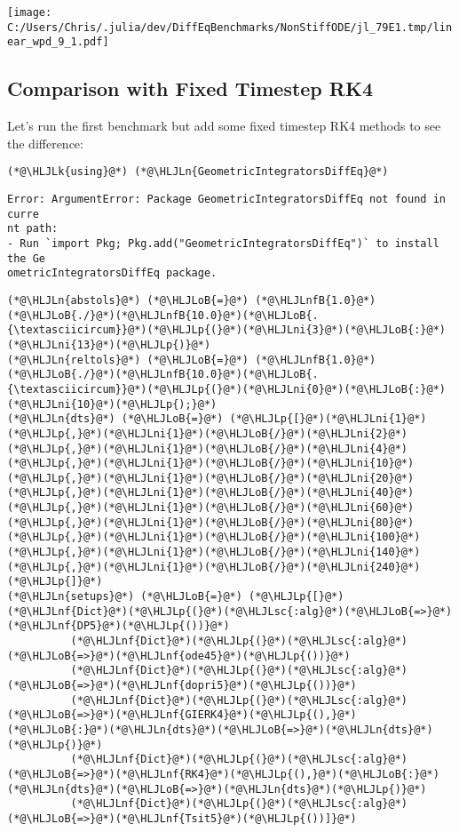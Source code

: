 \documentclass[12pt,a4paper]{article}
\newcommand{\HLJLk}[1]{\textcolor[RGB]{148,91,176}{\textbf{#1}}}
\newcommand{\HLJLn}[1]{#1}
\newcommand{\HLJLnf}[1]{\textcolor[RGB]{66,102,213}{#1}}
\newcommand{\HLJLsc}[1]{\textcolor[RGB]{201,61,57}{#1}}
\newcommand{\HLJLnfB}[1]{\textcolor[RGB]{59,151,46}{#1}}
\newcommand{\HLJLni}[1]{\textcolor[RGB]{59,151,46}{#1}}
\newcommand{\HLJLoB}[1]{\textcolor[RGB]{102,102,102}{\textbf{#1}}}
\newcommand{\HLJLp}[1]{#1}
\begin{document}
\texttt{[image: C:/Users/Chris/.julia/dev/DiffEqBenchmarks/NonStiffODE/jl\_79E1.tmp/linear\_wpd\_9\_1.pdf]}

\subsection{Comparison with Fixed Timestep RK4}
Let's run the first benchmark but add some fixed timestep RK4 methods to see the difference:


\begin{lstlisting}
(*@\HLJLk{using}@*) (*@\HLJLn{GeometricIntegratorsDiffEq}@*)
\end{lstlisting}

\begin{lstlisting}
Error: ArgumentError: Package GeometricIntegratorsDiffEq not found in curre
nt path:
- Run `import Pkg; Pkg.add("GeometricIntegratorsDiffEq")` to install the Ge
ometricIntegratorsDiffEq package.
\end{lstlisting}


\begin{lstlisting}
(*@\HLJLn{abstols}@*) (*@\HLJLoB{=}@*) (*@\HLJLnfB{1.0}@*)(*@\HLJLoB{./}@*)(*@\HLJLnfB{10.0}@*)(*@\HLJLoB{.{\textasciicircum}}@*)(*@\HLJLp{(}@*)(*@\HLJLni{3}@*)(*@\HLJLoB{:}@*)(*@\HLJLni{13}@*)(*@\HLJLp{)}@*)
(*@\HLJLn{reltols}@*) (*@\HLJLoB{=}@*) (*@\HLJLnfB{1.0}@*)(*@\HLJLoB{./}@*)(*@\HLJLnfB{10.0}@*)(*@\HLJLoB{.{\textasciicircum}}@*)(*@\HLJLp{(}@*)(*@\HLJLni{0}@*)(*@\HLJLoB{:}@*)(*@\HLJLni{10}@*)(*@\HLJLp{);}@*)
(*@\HLJLn{dts}@*) (*@\HLJLoB{=}@*) (*@\HLJLp{[}@*)(*@\HLJLni{1}@*)(*@\HLJLp{,}@*)(*@\HLJLni{1}@*)(*@\HLJLoB{/}@*)(*@\HLJLni{2}@*)(*@\HLJLp{,}@*)(*@\HLJLni{1}@*)(*@\HLJLoB{/}@*)(*@\HLJLni{4}@*)(*@\HLJLp{,}@*)(*@\HLJLni{1}@*)(*@\HLJLoB{/}@*)(*@\HLJLni{10}@*)(*@\HLJLp{,}@*)(*@\HLJLni{1}@*)(*@\HLJLoB{/}@*)(*@\HLJLni{20}@*)(*@\HLJLp{,}@*)(*@\HLJLni{1}@*)(*@\HLJLoB{/}@*)(*@\HLJLni{40}@*)(*@\HLJLp{,}@*)(*@\HLJLni{1}@*)(*@\HLJLoB{/}@*)(*@\HLJLni{60}@*)(*@\HLJLp{,}@*)(*@\HLJLni{1}@*)(*@\HLJLoB{/}@*)(*@\HLJLni{80}@*)(*@\HLJLp{,}@*)(*@\HLJLni{1}@*)(*@\HLJLoB{/}@*)(*@\HLJLni{100}@*)(*@\HLJLp{,}@*)(*@\HLJLni{1}@*)(*@\HLJLoB{/}@*)(*@\HLJLni{140}@*)(*@\HLJLp{,}@*)(*@\HLJLni{1}@*)(*@\HLJLoB{/}@*)(*@\HLJLni{240}@*)(*@\HLJLp{]}@*)
(*@\HLJLn{setups}@*) (*@\HLJLoB{=}@*) (*@\HLJLp{[}@*)(*@\HLJLnf{Dict}@*)(*@\HLJLp{(}@*)(*@\HLJLsc{:alg}@*)(*@\HLJLoB{=>}@*)(*@\HLJLnf{DP5}@*)(*@\HLJLp{())}@*)
          (*@\HLJLnf{Dict}@*)(*@\HLJLp{(}@*)(*@\HLJLsc{:alg}@*)(*@\HLJLoB{=>}@*)(*@\HLJLnf{ode45}@*)(*@\HLJLp{())}@*)
          (*@\HLJLnf{Dict}@*)(*@\HLJLp{(}@*)(*@\HLJLsc{:alg}@*)(*@\HLJLoB{=>}@*)(*@\HLJLnf{dopri5}@*)(*@\HLJLp{())}@*)
          (*@\HLJLnf{Dict}@*)(*@\HLJLp{(}@*)(*@\HLJLsc{:alg}@*)(*@\HLJLoB{=>}@*)(*@\HLJLnf{GIERK4}@*)(*@\HLJLp{(),}@*)(*@\HLJLoB{:}@*)(*@\HLJLn{dts}@*)(*@\HLJLoB{=>}@*)(*@\HLJLn{dts}@*)(*@\HLJLp{)}@*)
          (*@\HLJLnf{Dict}@*)(*@\HLJLp{(}@*)(*@\HLJLsc{:alg}@*)(*@\HLJLoB{=>}@*)(*@\HLJLnf{RK4}@*)(*@\HLJLp{(),}@*)(*@\HLJLoB{:}@*)(*@\HLJLn{dts}@*)(*@\HLJLoB{=>}@*)(*@\HLJLn{dts}@*)(*@\HLJLp{)}@*)
          (*@\HLJLnf{Dict}@*)(*@\HLJLp{(}@*)(*@\HLJLsc{:alg}@*)(*@\HLJLoB{=>}@*)(*@\HLJLnf{Tsit5}@*)(*@\HLJLp{())]}@*)
\end{lstlisting}
\end{document}
